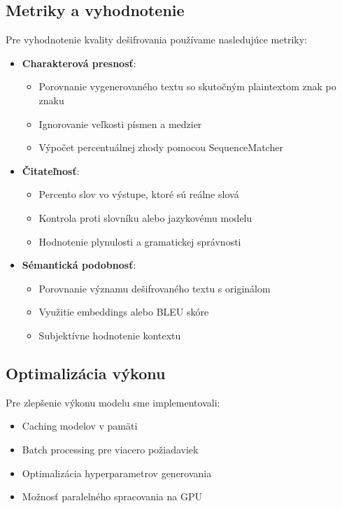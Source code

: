 \documentclass[12pt,a4paper]{article}
\begin{document}
\subsection{Metriky a vyhodnotenie}
Pre vyhodnotenie kvality dešifrovania používame nasledujúce metriky:

\begin{itemize}
    \item \textbf{Charakterová presnosť}:
    \begin{itemize}
        \item Porovnanie vygenerovaného textu so skutočným plaintextom znak po znaku
        \item Ignorovanie veľkosti písmen a medzier
        \item Výpočet percentuálnej zhody pomocou SequenceMatcher
    \end{itemize}
    
    \item \textbf{Čitateľnosť}:
    \begin{itemize}
        \item Percento slov vo výstupe, ktoré sú reálne slová
        \item Kontrola proti slovníku alebo jazykovému modelu
        \item Hodnotenie plynulosti a gramatickej správnosti
    \end{itemize}
    
    \item \textbf{Sémantická podobnosť}:
    \begin{itemize}
        \item Porovnanie významu dešifrovaného textu s originálom
        \item Využitie embeddings alebo BLEU skóre
        \item Subjektívne hodnotenie kontextu
    \end{itemize}
\end{itemize}

\subsection{Optimalizácia výkonu}
Pre zlepšenie výkonu modelu sme implementovali:

\begin{itemize}
    \item Caching modelov v pamäti
    \item Batch processing pre viacero požiadaviek
    \item Optimalizácia hyperparametrov generovania
    \item Možnosť paralelného spracovania na GPU
\end{itemize}
\end{document}
